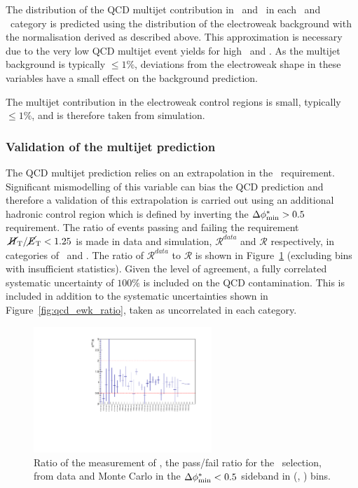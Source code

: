 The distribution of the QCD multijet contribution in \nb ~and \mht~in each \scalht~and \njet~category
is predicted using the distribution of the electroweak background with the normalisation
derived as described above. This approximation is necessary due to the very low QCD multijet
event yields for high \nb ~and \mht. As the multijet background is typically $\le 1\%$, 
deviations from the electroweak shape in these variables have a small effect on the background prediction.

The multijet contribution in the electroweak control regions is small, typically $\le 1\%$, and is 
therefore taken from simulation.

\subsubsection{Validation of the multijet prediction}

The QCD multijet prediction relies on an extrapolation in the \mhtmet~requirement.
Significant mismodelling of this variable can bias the QCD prediction and therefore a validation
of this extrapolation is carried out using an additional hadronic control 
region which is defined by inverting the $\mbox{$\Delta\phi^{*}_{\rm min}$} > 0.5$ requirement. The ratio of events passing and failing 
the requirement $\mbox{$\mbox{$\,\cancel{H}_{\rm T}$} / \mbox{$\cancel{E}_\text{T}$}$} < 1.25$ is made in data and simulation, $\mathcal{R}^{data}$ and $\mathcal{R}$ respectively,
in categories of \njet~and \scalht. The ratio of $\mathcal{R}^{data}$ to $\mathcal{R}$ is shown in
Figure~\ref{fig:RR_qcd} (excluding bins with insufficient statistics). 
Given the level of agreement, a fully correlated systematic uncertainty of $100\%$ is included on
the QCD contamination. This is included in addition to the systematic uncertainties shown in 
Figure~\ref{fig:qcd_ewk_ratio}, taken as uncorrelated in each category.

\begin{figure}[h!]
  \begin{center}        
    \includegraphics[width=0.6\textwidth]{figures/qcd/plots/doubleQcdSbSrRatio1D}
    \caption{ Ratio of the measurement of \rmhtmet, the pass/fail ratio for the \mhtmet~selection, from data and Monte Carlo in the $\mbox{$\Delta\phi^{*}_{\rm min}$} < 0.5$ sideband in (\scalht, \njet) bins.  
    }
    \label{fig:RR_qcd}
  \end{center} 
\end{figure}

